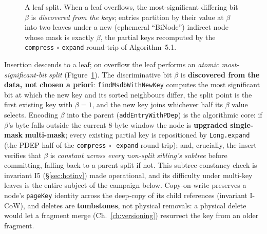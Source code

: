 \documentclass[11pt,a4paper,oneside]{report}
\theoremstyle{sirixthm}
\newcommand{\code}[1]{\texttt{#1}}
\begin{document}
\begin{figure}[t]\centering
{}
\caption{A leaf split. When a leaf overflows, the most-significant differing bit $\beta$ is
\emph{discovered from the keys}; entries partition by their value at $\beta$ into two leaves under a
new (ephemeral ``BiNode'') indirect node whose mask is exactly $\beta$, the partial keys recomputed
by the \code{compress}$\,\circ\,$\code{expand} round-trip of Algorithm~5.1.}
\label{fig:hotsplit}
\end{figure}

Insertion descends to a leaf; on overflow the leaf performs an \emph{atomic most-significant-bit
split} (Figure~\ref{fig:hotsplit}). The discriminative bit $\beta$ is \textbf{discovered from the
data, not chosen a priori}: \code{findMsdbWithNewKey} computes the most significant bit at which the
new key and its sorted neighbours differ, the split point is the first existing key with $\beta=1$,
and the new key joins whichever half its $\beta$ value selects. Encoding $\beta$ into the parent
(\code{addEntryWithPDep}) is the algorithmic core: if $\beta$'s byte falls outside the current 8-byte
window the node is \textbf{upgraded single-mask\,\textrightarrow\,multi-mask}; every existing partial
key is repositioned by \code{Long.expand} (the PDEP half of the \code{compress}$\,\circ\,$%
\code{expand} round-trip); and, crucially, the insert verifies that $\beta$ is \emph{constant
across every non-split sibling's subtree} before committing, falling back to a parent split if not.
This subtree-constancy check is invariant I5 (\S\ref{sec:hotinv}) made operational, and its
difficulty under multi-key leaves is the entire subject of the campaign below. Copy-on-write
preserves a node's \code{pageKey} identity across the deep-copy of its child references (invariant
I-CoW), and deletes are \textbf{tombstones}, not physical removals: a physical delete would let a
fragment merge (Ch.~\ref{ch:versioning}) resurrect the key from an older fragment.
\end{document}
